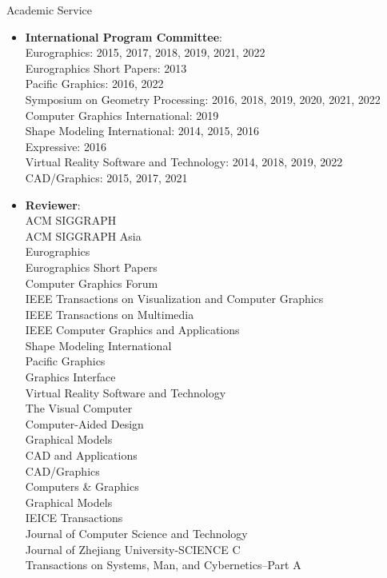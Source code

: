 {\Large\sc Academic Service}
\vspace{-3mm}
\begin{itemize}
\item {\bf International Program Committee}:\\
Eurographics: 2015, 2017, 2018, 2019, 2021, 2022\\
Eurographics Short Papers: 2013\\
Pacific Graphics: 2016, 2022\\
Symposium on Geometry Processing: 2016, 2018, 2019, 2020, 2021, 2022\\
Computer Graphics International: 2019\\
Shape Modeling International: 2014, 2015, 2016\\
Expressive: 2016\\
Virtual Reality Software and Technology: 2014, 2018, 2019, 2022\\
CAD/Graphics: 2015, 2017, 2021\\

\item {\bf Reviewer}:\\
ACM SIGGRAPH\\
ACM SIGGRAPH Asia\\
Eurographics\\
Eurographics Short Papers\\
Computer Graphics Forum\\
IEEE Transactions on Visualization and Computer Graphics\\
IEEE Transactions on Multimedia\\
IEEE Computer Graphics and Applications\\
Shape Modeling International\\
Pacific Graphics\\
Graphics Interface\\
Virtual Reality Software and Technology\\
The Visual Computer\\
Computer-Aided Design\\
Graphical Models\\
CAD and Applications\\
CAD/Graphics\\
Computers \& Graphics\\
Graphical Models\\
IEICE Transactions\\
Journal of Computer Science and Technology\\
Journal of Zhejiang University-SCIENCE C\\
Transactions on Systems, Man, and Cybernetics--Part A
\end{itemize}
